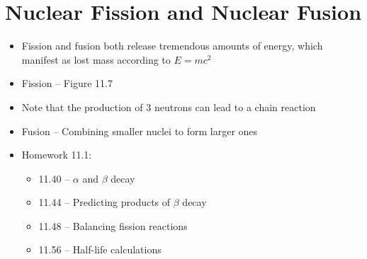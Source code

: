 \documentclass[12pt, openany, letterpaper]{memoir}
\begin{document}
\section{Nuclear Fission and Nuclear Fusion}
\begin{itemize}
	\item Fission and fusion both release tremendous amounts of energy, which manifest as lost mass according to $E=mc^2$
	\item Fission -- Figure 11.7

	\item Note that the production of 3 neutrons can lead to a chain reaction
	\item Fusion -- Combining smaller nuclei to form larger ones



	\item Homework 11.1:
	      \begin{itemize}
		      \item 11.40 -- $\alpha$ and $\beta$ decay
		      \item 11.44 -- Predicting products of $\beta$ decay
		      \item 11.48 -- Balancing fission reactions
		      \item 11.56 -- Half-life calculations
	      \end{itemize}
\end{itemize}
\end{document}
